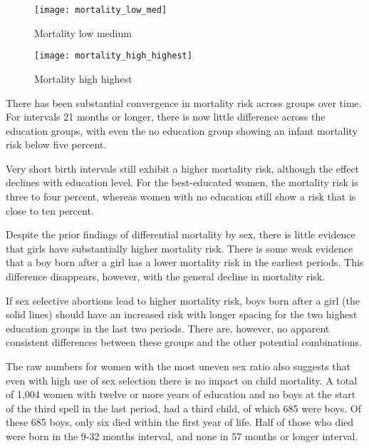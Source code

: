 \documentclass[12pt,letterpaper]{article}
\begin{document}
\begin{figure}
\centering
\texttt{[image: mortality\_low\_med]}
\caption{Mortality low medium}
\label{fig:mortality_low_med}
\end{figure}


\begin{figure}
\centering
\texttt{[image: mortality\_high\_highest]}
\caption{Mortality high highest}
\label{fig:mortality_high_highest}
\end{figure}




There has been substantial convergence in mortality risk across groups over time.
For intervals 21 months or longer, there is now little difference across 
the education groups, with even the no education group showing an infant mortality risk 
below five percent.

Very short birth intervals still exhibit a higher mortality risk, although the 
effect declines with education level.
For the best-educated women, the mortality risk is three to four percent,
whereas women with no education still show a risk that is close to ten percent.

Despite the prior findings of differential mortality by sex, there is little evidence 
that girls have substantially higher mortality risk.
There is some weak evidence that a boy born after a girl has a lower mortality
risk in the earliest periods.
This difference disappears, however, with the general decline in mortality risk. 

If sex selective abortions lead to higher mortality risk, boys born after a girl 
(the solid lines)
should have an increased risk with longer spacing for the two highest education groups 
in the last two periods.
There are, however, no apparent consistent differences between these groups and the other 
potential combinations.

The raw numbers for women with the most uneven sex ratio also suggests that even with 
high use of sex selection there is no impact on child mortality. 
A total of 1,004 women with twelve or more years of
education and no boys at the start of the third spell in the last
period, had a third child, of which 685 were boys. 
Of these 685 boys, only six died within the first year of life.
Half of those who died were born in the 9-32 months interval, and none in 57 months 
or longer interval.
\end{document}
